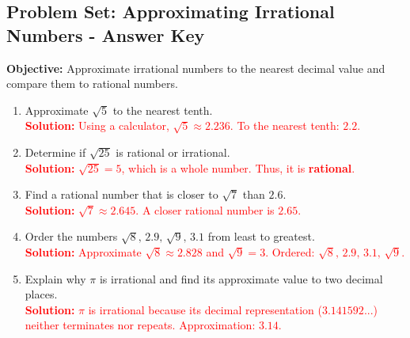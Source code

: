 \documentclass[12pt]{article}
\title{}
\date{}
\begin{document}
\subsection*{Problem Set: Approximating Irrational Numbers - Answer Key}
\onehalfspacing

\begin{tcolorbox}[colframe=black!40, colback=gray!5, 
coltitle=black, colbacktitle=black!20, fonttitle=\bfseries\Large, 
title=Learning Objective, halign title=center, left=5pt, right=5pt, top=5pt, bottom=15pt]
\textbf{Objective:} Approximate irrational numbers to the nearest decimal value and compare them to rational numbers.
\end{tcolorbox}

\begin{tcolorbox}[colframe=black!60, colback=white, 
coltitle=black, colbacktitle=black!15, fonttitle=\bfseries\Large, 
title=Exercises, halign title=center, left=10pt, right=10pt, top=10pt, bottom=60pt]
\begin{enumerate}[itemsep=3em]
    \item Approximate \( \sqrt{5} \) to the nearest tenth.\\
    \textcolor{red}{\textbf{Solution:} Using a calculator, \( \sqrt{5} \approx 2.236 \). To the nearest tenth: \(2.2\).}

    \item Determine if \( \sqrt{25} \) is rational or irrational.\\
    \textcolor{red}{\textbf{Solution:} \( \sqrt{25} = 5 \), which is a whole number. Thus, it is \textbf{rational}.}

    \item Find a rational number that is closer to \( \sqrt{7} \) than \( 2.6 \).\\
    \textcolor{red}{\textbf{Solution:} \( \sqrt{7} \approx 2.645 \). A closer rational number is \(2.65\).}

    \item Order the numbers \( \sqrt{8}, \, 2.9, \, \sqrt{9}, \, 3.1 \) from least to greatest.\\
    \textcolor{red}{\textbf{Solution:} Approximate \( \sqrt{8} \approx 2.828 \) and \( \sqrt{9} = 3. \) Ordered: \( \sqrt{8}, \, 2.9, \, 3.1, \, \sqrt{9} \).}

    \item Explain why \( \pi \) is irrational and find its approximate value to two decimal places.\\
    \textcolor{red}{\textbf{Solution:} \( \pi \) is irrational because its decimal representation (\(3.141592...\)) neither terminates nor repeats. Approximation: \(3.14\).}
\end{enumerate}
\end{tcolorbox}
\end{document}

